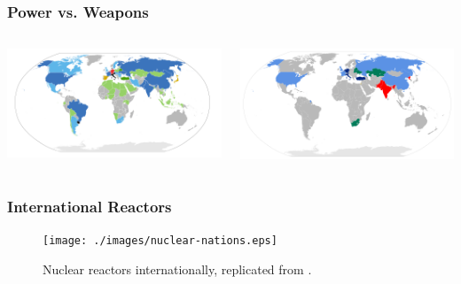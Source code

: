 \begin{frame}
  \frametitle{Power vs. Weapons}
        \begin{columns}
        \begin{center}
      \includegraphics[width=\textwidth]{./images/nuclear-nations-map.png}\\
    \end{center}
\hspace{-1in}
                \begin{center}
		      \includegraphics[width=\textwidth]{./images/nuclear-weapons-map.png}
                \end{center}
        \end{columns}
\end{frame}        


\begin{frame}
  \frametitle{International Reactors}
  \begin{figure}[htbp!]
    \begin{center}
      \texttt{[image: ./images/nuclear-nations.eps]}
    \end{center}
          \caption{Nuclear reactors internationally, replicated from 
          \cite{iaea_nuclear_2019}.}
    \label{fig:nuc-nations}
  \end{figure}
\end{frame}

